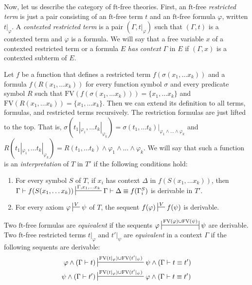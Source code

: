 \documentclass[reqno]{amsart}
\theoremstyle{definition}
\theoremstyle{remark}
\newcommand{\fs}[1]{\mathrm{#1}}
\newcommand{\FV}{\fs{FV}}
\newcommand{\ft}{\fs{ft}}
\numberwithin{figure}{section}
\begin{document}
Now, let us describe the category of $\ft$-free theories.
First, an $\ft$-free \emph{restricted term} is just a pair consisting of an $\ft$-free term $t$ and an $\ft$-free formula $\varphi$, written $t|_\varphi$.
A \emph{contexted restricted term} is a pair $(\Gamma,t|_\varphi)$ such that $(\Gamma,t)$ is a contexted term and $\varphi$ is a formula.
We will say that a free variable $x$ of a contexted restricted term or a formula $E$ \emph{has context} $\Gamma$ in $E$ if $(\Gamma,x)$ is a contexted subterm of $E$.

Let $f$ be a function that defines a restricted term $f(\sigma(x_1, \ldots x_k))$ and a formula $f(R(x_1, \ldots x_k))$ for every function symbol $\sigma$ and every predicate symbol $R$ such that $\FV(f(\sigma(x_1, \ldots x_k))) = \{ x_1, \ldots x_k \}$ and $\FV(R(x_1, \ldots x_k)) = \{ x_1, \ldots x_k \}$.
Then we can extend its definition to all terms, formulas, and restricted terms recursively.
The restriction formulas are just lifted to the top.
That is, $\sigma(t_1|_{\varphi_1}, \ldots t_k|_{\varphi_k}) = \sigma(t_1, \ldots t_k)|_{\varphi_1 \land \ldots \land \varphi_k}$ and $R(t_1|_{\varphi_1}, \ldots t_k|_{\varphi_k}) = R(t_1, \ldots t_k) \land \varphi_1 \land \ldots \land \varphi_k$.
We will say that such a function is an \emph{interpretation} of $T$ in $T'$ if the following conditions hold:
\begin{enumerate}
\item \label{it:interp-symb} For every symbol $S$ of $T$, if $x_i$ has context $\Delta$ in $f(S(x_1, \ldots x_k))$, then $\Gamma \vdash f(S(x_1, \ldots x_k)) \sststile{}{\Gamma, x_1, \ldots x_k} \Gamma \vdash \Delta \equiv f(\Gamma^S_i)$ is derivable in $T'$.
\item \label{it:interp-axiom} For every axiom $\varphi \sststile{}{V} \psi$ of $T$, the sequent $f(\varphi) \sststile{}{V} f(\psi)$ is derivable.
\end{enumerate}

Two $\ft$-free formulas are \emph{equivalent} if the sequents $\varphi \ssststile{}{\FV(\varphi) \cup \FV(\psi)} \psi$ are derivable.
Two $\ft$-free restricted terms $t|_\varphi$ and $t'|_\psi$ are \emph{equivalent} in a context $\Gamma$ if the following sequents are derivable:
\begin{align*}
\varphi \land (\Gamma \vdash t) & \sststile{}{\FV(t|_\varphi) \cup \FV(t'|_\psi)} \psi \land (\Gamma \vdash t \equiv t') \\
\psi \land (\Gamma \vdash t') & \sststile{}{\FV(t|_\varphi) \cup \FV(t'|_\psi)} \varphi \land (\Gamma \vdash t \equiv t')
\end{align*}
\end{document}
